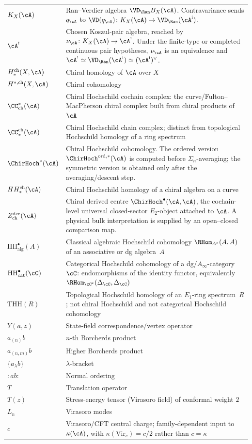 \begin{longtable}{p{3cm} p{10cm}}
%
$K_X(\cA)$ & Ran--Verdier algebra $\VD_{\Ran}B_X(\cA)$.  Contravariance sends $q_\cA$ to $\VD(q_\cA)\colon K_X(\cA)\to\VD_{\Ran}(\cA^{\mathrm i})$. \\
$\cA^!$ & Chosen Koszul-pair algebra, reached by $\nu_\cA\colon K_X(\cA)\to\cA^!$.  Under the finite-type or completed continuous pair hypotheses, $\nu_\cA$ is an equivalence and $\cA^!\simeq\VD_{\Ran}(\cA^{\mathrm i})\simeq(\cA^{\mathrm i})^\vee$. \\
$H^{\mathrm{ch}}_*(X, \cA)$ & Chiral homology of $\cA$ over $X$ \\
$H^{*,\mathrm{ch}}(X, \cA)$ & Chiral cohomology \\
$\CC^*_{\mathrm{ch}}(\cA)$ & Chiral Hochschild cochain complex: the curve/Fulton--MacPherson chiral complex built from chiral products of $\cA$ \\
$\CC_*^{\mathrm{ch}}(\cA)$ & Chiral Hochschild chain complex; distinct from topological Hochschild homology of a ring spectrum \\
%
$\ChirHoch^*(\cA)$ & Chiral Hochschild cohomology. The ordered version $\ChirHoch^{\mathrm{ord},*}(\cA)$ is computed before $\Sigma_n$-averaging; the symmetric version is obtained only after the averaging/descent step. \\
$HH_*^{\mathrm{ch}}(\cA)$ & Chiral Hochschild homology of a chiral algebra on a curve \\
$Z^{\mathrm{der}}_{\mathrm{ch}}(\cA)$ & Chiral derived centre $\ChirHoch^\bullet(\cA,\cA)$, the cochain-level universal closed-sector $E_2$-object attached to $\cA$.  A physical bulk interpretation is supplied by an open--closed comparison map. \\
$\mathrm{HH}^\bullet_{\mathrm{alg}}(A)$ & Classical algebraic Hochschild cohomology $\RHom_{A^e}(A,A)$ of an associative or dg algebra~$A$ \\
$\mathrm{HH}^\bullet_{\mathrm{cat}}(\cC)$ & Categorical Hochschild cohomology of a dg/$A_\infty$-category~$\cC$: endomorphisms of the identity functor, equivalently $\RHom_{\cC^e}(\Delta_\cC,\Delta_\cC)$ \\
$\mathrm{THH}(R)$ & Topological Hochschild homology of an $E_1$-ring spectrum~$R$; not chiral Hochschild and not categorical Hochschild cohomology \\
$Y(a, z)$ & State-field correspondence/vertex operator \\
$a_{(n)} b$ & $n$-th Borcherds product \\
$a_{(n,m)} b$ & Higher Borcherds product \\
%
$\{a_\lambda b\}$ & $\lambda$-bracket \\
$: ab :$ & Normal ordering \\
$T$ & Translation operator \\
$T(z)$ & Stress-energy tensor (Virasoro field) of conformal weight $2$ \\
$L_n$ & Virasoro modes \\
$c$ & Virasoro/CFT central charge; family-dependent input to $\kappa(\cA)$, with $\kappa(\mathrm{Vir}_c)=c/2$ rather than $c=\kappa$ \\
\end{longtable}



